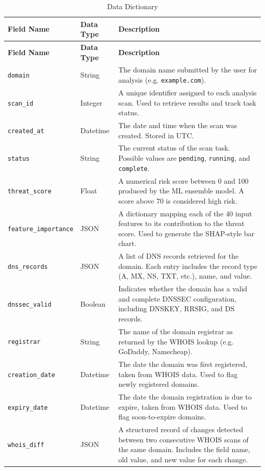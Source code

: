 \documentclass[12pt, a4paper, oneside]{report}
\begin{document}
\begin{longtable}{|p{4.5cm}|p{2cm}|p{7.5cm}|}
\caption{Data Dictionary}\\
\hline
\rowcolor{nfsuBlue!15}
\textbf{Field Name} & \textbf{Data Type} & \textbf{Description} \\
\hline
\endfirsthead
\hline
\rowcolor{nfsuBlue!15}
\textbf{Field Name} & \textbf{Data Type} & \textbf{Description} \\
\hline
\endhead
\hline
\endfoot
\texttt{domain} & String & The domain name submitted by the user for analysis (e.g. \texttt{example.com}). \\
\hline
\texttt{scan\_id} & Integer & A unique identifier assigned to each analysis scan. Used to retrieve results and track task status. \\
\hline
\texttt{created\_at} & Datetime & The date and time when the scan was created. Stored in UTC. \\
\hline
\texttt{status} & String & The current status of the scan task. Possible values are \texttt{pending}, \texttt{running}, and \texttt{complete}. \\
\hline
\texttt{threat\_score} & Float & A numerical risk score between 0 and 100 produced by the ML ensemble model. A score above 70 is considered high risk. \\
\hline
\texttt{feature\_importance} & JSON & A dictionary mapping each of the 40 input features to its contribution to the threat score. Used to generate the SHAP-style bar chart. \\
\hline
\texttt{dns\_records} & JSON & A list of DNS records retrieved for the domain. Each entry includes the record type (A, MX, NS, TXT, etc.), name, and value. \\
\hline
\texttt{dnssec\_valid} & Boolean & Indicates whether the domain has a valid and complete DNSSEC configuration, including DNSKEY, RRSIG, and DS records. \\
\hline
\texttt{registrar} & String & The name of the domain registrar as returned by the WHOIS lookup (e.g. GoDaddy, Namecheap). \\
\hline
\texttt{creation\_date} & Datetime & The date the domain was first registered, taken from WHOIS data. Used to flag newly registered domains. \\
\hline
\texttt{expiry\_date} & Datetime & The date the domain registration is due to expire, taken from WHOIS data. Used to flag soon-to-expire domains. \\
\hline
\texttt{whois\_diff} & JSON & A structured record of changes detected between two consecutive WHOIS scans of the same domain. Includes the field name, old value, and new value for each change. \\

\end{longtable}
\end{document}
